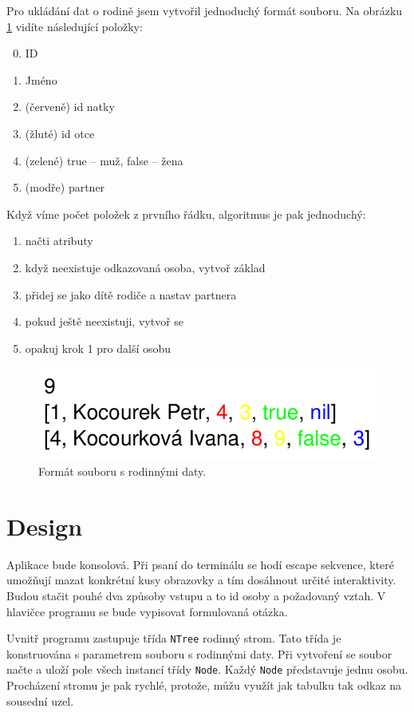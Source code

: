 \documentclass[a4paper, 12pt]{article}
\begin{document}
Pro ukládání dat o rodině jsem vytvořil jednoduchý formát souboru.
Na obrázku \ref{fig:family} vidíte následující položky:

\begin{enumerate}
\setcounter{enumi}{-1}
\item ID
\item Jméno
\item (červeně) id natky
\item (žluté) id otce
\item (zelené) true -- muž, false -- žena
\item (modře) partner
\end{enumerate}

Když víme počet položek z prvního řádku, algoritmus je pak jednoduchý:
\begin{enumerate}
\item načti atributy
\item když neexistuje odkazovaná osoba, vytvoř základ
\item přidej se jako dítě rodiče a nastav partnera
\item pokud ještě neexistuji, vytvoř se
\item opakuj krok 1 pro další osobu
\end{enumerate}

\begin{figure}
\centering
\includegraphics{format_family}
\caption{Formát souboru s rodinnými daty.}
\label{fig:family}
\end{figure}

\section{Design}
Aplikace bude konsolová. Při psaní do terminálu se hodí escape sekvence,
které umožňují mazat konkrétní kusy obrazovky a tím dosáhnout určité
interaktivity. Budou stačit pouhé dva způsoby vstupu a to id osoby a
požadovaný vztah. V hlavičce programu se bude vypisovat formulovaná
otázka.

Uvnitř programu zastupuje třída \texttt{NTree} rodinný strom. Tato třída je
konstruována s parametrem souboru s rodinnými daty. Při vytvoření
se soubor načte a uloží pole všech instancí třídy \texttt{Node}.
Každý \texttt{Node} představuje jednu osobu. Procházení
stromu je pak rychlé, protože, můžu využít jak tabulku tak
odkaz na sousední uzel.
\end{document}
